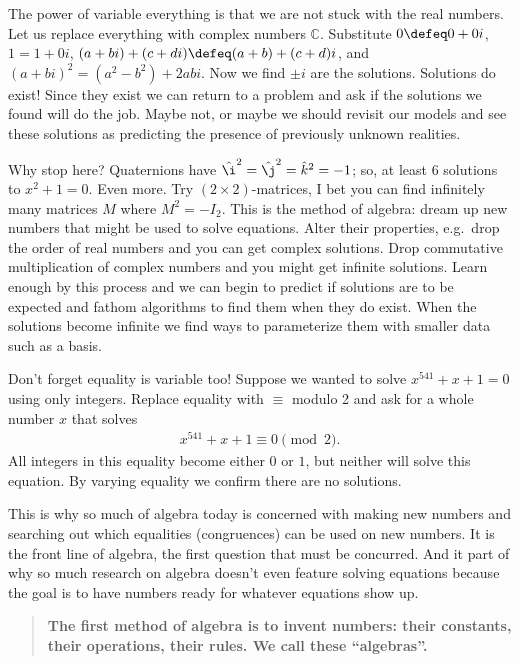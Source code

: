 The power of variable everything is that we are not stuck with the real numbers.
Let us replace everything with complex numbers $\mathbb{C}$. Substitute $0\defeq
0+0i$, $1=1+0i$, $(a+bi)+(c+di)\defeq (a+b)+(c+d)i$, and
$(a+bi)^2=(a^2-b^2)+2abi$.  Now we find $\pm i$ are the solutions. Solutions do
exist!  Since they exist we can return to a problem and ask if the solutions we 
found will do the job.  Maybe not, or maybe we should revisit our models and 
see these solutions as predicting the presence of previously unknown realities.

Why stop here? Quaternions have $\hat{\i}^2=\hat{\j}^2=\hat{k}^2=-1$;
so, at least 6 solutions to $x^2+1=0$.  Even more.  Try $(2\times 2)$-matrices, I
bet you can find infinitely many matrices $M$ where $M^2=-I_2$.  This is the method
of algebra: dream up new numbers that might be used to solve equations.  Alter
their properties, e.g.\ drop the order of real numbers and you can get complex
solutions.  Drop commutative multiplication of complex numbers and you might get
infinite solutions.  Learn enough by this process and we can begin to predict if
solutions are to be expected and fathom algorithms to find them when they do
exist. When the solutions become infinite we find ways to parameterize them with
smaller data such as a basis.

Don't forget equality is variable too!  Suppose we wanted to solve $x^{541}+x+1=0$
using only integers.  Replace equality 
with $\equiv$ modulo 2 and ask for a whole number $x$ that solves
\begin{align*}
    x^{541}+x+1\equiv 0\pmod{2}.
\end{align*}
All integers in this equality become either $0$ or $1$, but neither will solve 
this equation.  By varying equality we confirm there are no solutions.

This is why so much of algebra today is concerned with making new numbers and 
searching out which equalities (congruences) can be used on new numbers.  It is 
the front line of algebra, the first question that must be concurred.  And it part 
of why so much research on algebra doesn't even feature solving equations because 
the goal is to have numbers ready for whatever equations show up.

\begin{quote}
    \textbf{The first method of algebra is to invent numbers: their constants, their 
    operations, their rules.  We call these ``algebras''.}
\end{quote}

